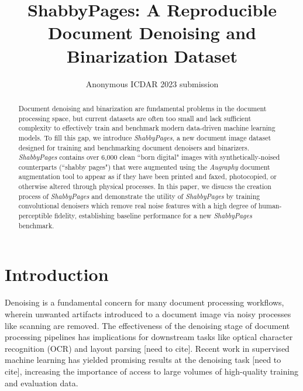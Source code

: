 \documentclass[runningheads]{llncs}
\begin{document}
\title{ShabbyPages: A Reproducible Document Denoising and Binarization Dataset}
%
%

\author{Anonymous ICDAR 2023 submission}


\maketitle

\begin{abstract}
Document denoising and binarization are fundamental problems in the document processing space, but current datasets are often too small and lack sufficient complexity to effectively train and benchmark modern data-driven machine learning models.
To fill this gap, we introduce \emph{ShabbyPages}, a new document image dataset designed for training and benchmarking document denoisers and binarizers.
\emph{ShabbyPages} contains over 6,000 clean ``born digital" images with synthetically-noised counterparts (``shabby pages") that were augmented using the \emph{Augraphy} document augmentation tool to appear as if they have been printed and faxed, photocopied, or otherwise altered through physical processes.
In this paper, we disucss the creation process of \emph{ShabbyPages} and demonstrate the utility of \emph{ShabbyPages} by training convolutional denoisers which remove real noise features with a high degree of human-perceptible fidelity, establishing baseline performance for a new \emph{ShabbyPages} benchmark.
\end{abstract}

\section{Introduction}
Denoising is a fundamental concern for many document processing workflows, wherein unwanted artifacts introduced to a document image via noisy processes like scanning are removed.
The effectiveness of the denoising stage of document processing pipelines has implications for downstream tasks like optical character recognition (OCR) and layout parsing [need to cite].
Recent work in supervised machine learning has yielded promising results at the denoising task [need to cite], increasing the importance of access to large volumes of high-quality training and evaluation data.
\end{document}

